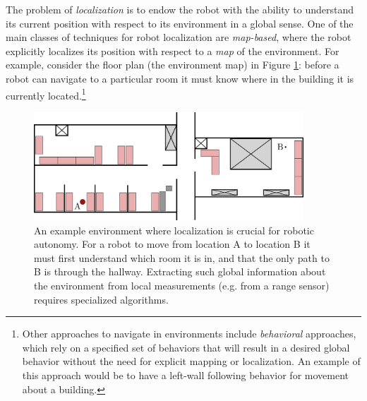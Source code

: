 The problem of \textit{localization} is to endow the robot with the ability to understand its current position with respect to its environment in a global sense\cite{ThrunBurgardEtAl2005}\cite{SiegwartNourbakhshEtAl2011}.
One of the main classes of techniques for robot localization are \textit{map-based}, where the robot explicitly localizes its position with respect to a \textit{map} of the environment.
For example, consider the floor plan (the environment map) in Figure \ref{fig:sample-room}: before a robot can navigate to a particular room it must know where in the building it is currently located.\footnote{Other approaches to navigate in environments include \textit{behavioral} approaches, which rely on a specified set of behaviors that will result in a desired global behavior without the need for explicit mapping or localization. An example of this approach would be to have a left-wall following behavior for movement about a building.}
\begin{figure}[ht]
	\centering
    \includegraphics[width=0.9\textwidth]{tex/figs/ch13_figs/map.png}
    \caption{An example environment where localization is crucial for robotic autonomy. For a robot to move from location A to location B it must first understand which room it is in, and that the only path to B is through the hallway. Extracting such global information about the environment from local measurements (e.g. from a range sensor) requires specialized algorithms.}
    \label{fig:sample-room}
\end{figure}

